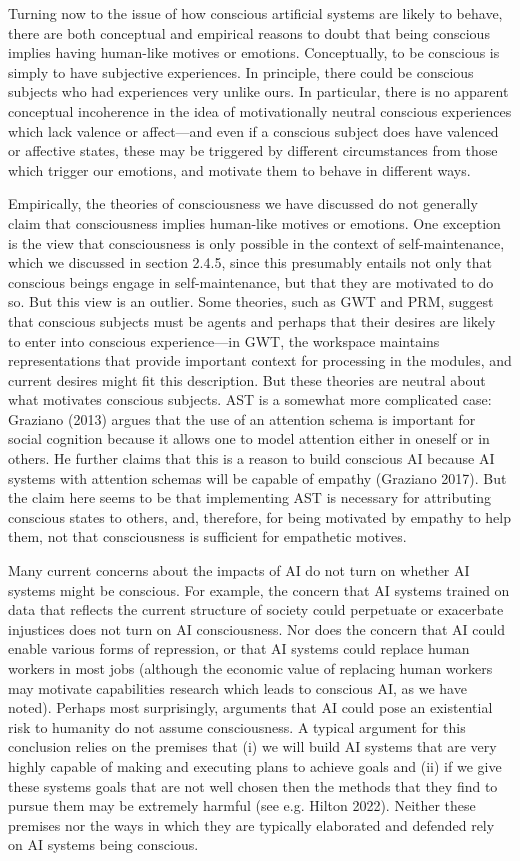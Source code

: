 \documentclass[12pt]{article}
\begin{document}
Turning now to the issue of how conscious artificial systems are likely to behave, there are both conceptual and empirical reasons to doubt that being conscious implies having human-like motives or emotions. Conceptually, to be conscious is simply to have subjective experiences. In principle, there could be conscious subjects who had experiences very unlike ours. In particular, there is no apparent conceptual incoherence in the idea of motivationally neutral conscious experiences which lack valence or affect—and even if a conscious subject does have valenced or affective states, these may be triggered by different circumstances from those which trigger our emotions, and motivate them to behave in different ways.

Empirically, the theories of consciousness we have discussed do not generally claim that consciousness implies human-like motives or emotions. One exception is the view that consciousness is only possible in the context of self-maintenance, which we discussed in section 2.4.5, since this presumably entails not only that conscious beings engage in self-maintenance, but that they are motivated to do so. But this view is an outlier. Some theories, such as GWT and PRM, suggest that conscious subjects must be agents and perhaps that their desires are likely to enter into conscious experience—in GWT, the workspace maintains representations that provide important context for processing in the modules, and current desires might fit this description. But these theories are neutral about what motivates conscious subjects. AST is a somewhat more complicated case: Graziano (2013) argues that the use of an attention schema is important for social cognition because it allows one to model attention either in oneself or in others. He further claims that this is a reason to build conscious AI because AI systems with attention schemas will be capable of empathy (Graziano 2017). But the claim here seems to be that implementing AST is necessary for attributing conscious states to others, and, therefore, for being motivated by empathy to help them, not that consciousness is sufficient for empathetic motives.

Many current concerns about the impacts of AI do not turn on whether AI systems might be conscious. For example, the concern that AI systems trained on data that reflects the current structure of society could perpetuate or exacerbate injustices does not turn on AI consciousness. Nor does the concern that AI could enable various forms of repression, or that AI systems could replace human workers in most jobs (although the economic value of replacing human workers may motivate capabilities research which leads to conscious AI, as we have noted). Perhaps most surprisingly, arguments that AI could pose an existential risk to humanity do not assume consciousness. A typical argument for this conclusion relies on the premises that (i) we will build AI systems that are very highly capable of making and executing plans to achieve goals and (ii) if we give these systems goals that are not well chosen then the methods that they find to pursue them may be extremely harmful (see e.g. Hilton 2022). Neither these premises nor the ways in which they are typically elaborated and defended rely on AI systems being conscious.
\end{document}
